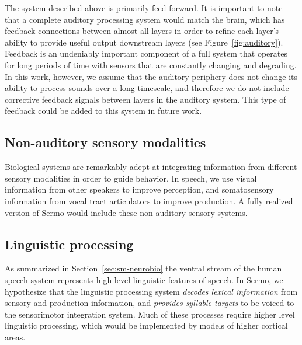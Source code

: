 The system described above
is primarily feed-forward.
It is important to note that
a complete auditory processing system
would match the brain,
which has feedback connections
between almost all layers
in order to refine each layer's ability
to provide useful output downstream layers
(see Figure~\ref{fig:auditory}).
Feedback is an undeniably important
component of a full system that operates
for long periods of time with sensors
that are constantly changing and degrading.
In this work, however, we assume
that the auditory periphery does not change
its ability to process sounds over a long timescale,
and therefore we do not include corrective feedback
signals between layers in the auditory system.
This type of feedback could be added
to this system in future work.

\subsection{Non-auditory sensory modalities}

Biological systems are remarkably adept
at integrating information
from different sensory modalities
in order to guide behavior.
In speech,
we use visual information
from other speakers to improve perception,
and somatosensory information
from vocal tract articulators
to improve production.
A fully realized version of Sermo
would include these non-auditory sensory systems.

\subsection{Linguistic processing}
\label{sec:sermo-linguistic}


As summarized in Section~\ref{sec:sm-neurobio}
the ventral stream of the human speech system
represents high-level linguistic features of speech.
In Sermo, we hypothesize that
the linguistic processing system
\textit{decodes lexical information}
from sensory and production information,
and \textit{provides syllable targets}
to be voiced to the sensorimotor integration system.
Much of these processes require
higher level linguistic processing,
which would be implemented by
models of higher cortical areas.

